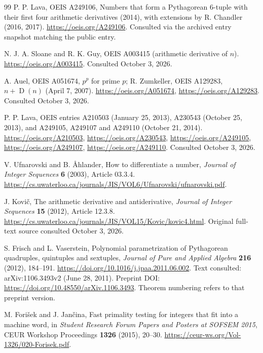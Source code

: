 \documentclass[11pt,a4paper]{article}
\theoremstyle{remark}
\newcommand{\D}{\operatorname{D}}
\begin{document}
\clearpage
\begin{thebibliography}{99}
P. P. Lava, OEIS A249106, Numbers that form a Pythagorean 6-tuple with their
first four arithmetic derivatives (2014), with extensions by R. Chandler
(2016, 2017). \url{https://oeis.org/A249106}.
Consulted via the archived entry snapshot matching the public entry.

N. J. A. Sloane and R. K. Guy, OEIS A003415 (arithmetic derivative of $n$).
\url{https://oeis.org/A003415}. Consulted October 3, 2026.

A. Auel, OEIS A051674, $p^p$ for prime $p$;
R. Zumkeller, OEIS A129283, $n+\D(n)$ (April 7, 2007).
\url{https://oeis.org/A051674}, \url{https://oeis.org/A129283}.
Consulted October 3, 2026.

P. P. Lava, OEIS entries A210503 (January 25, 2013),
A230543 (October 25, 2013), and A249105, A249107 and A249110
(October 21, 2014).
\url{https://oeis.org/A210503}, \url{https://oeis.org/A230543},
\url{https://oeis.org/A249105}, \url{https://oeis.org/A249107},
\url{https://oeis.org/A249110}. Consulted October 3, 2026.

V. Ufnarovski and B. \AA hlander, How to differentiate a number,
\emph{Journal of Integer Sequences} \textbf{6} (2003), Article 03.3.4.
\url{https://cs.uwaterloo.ca/journals/JIS/VOL6/Ufnarovski/ufnarovski.pdf}.

J. Kovi\v{c}, The arithmetic derivative and antiderivative,
\emph{Journal of Integer Sequences} \textbf{15} (2012), Article 12.3.8.
\url{https://cs.uwaterloo.ca/journals/JIS/VOL15/Kovic/kovic4.html}.
Original full-text source consulted October 3, 2026.

S. Frisch and L. Vaserstein, Polynomial parametrization of Pythagorean
quadruples, quintuples and sextuples, \emph{Journal of Pure and Applied
Algebra} \textbf{216} (2012), 184--191.
\url{https://doi.org/10.1016/j.jpaa.2011.06.002}.
Text consulted: arXiv:1106.3493v2 (June 28, 2011).
Preprint DOI: \url{https://doi.org/10.48550/arXiv.1106.3493}.
Theorem numbering refers to that preprint version.

M. Fori\v{s}ek and J. Jan\v{c}ina, Fast primality testing for integers that fit
into a machine word, in \emph{Student Research Forum Papers and Posters at
SOFSEM 2015}, CEUR Workshop Proceedings \textbf{1326} (2015), 20--30.
\url{https://ceur-ws.org/Vol-1326/020-Forisek.pdf}.


\end{thebibliography}
\end{document}
